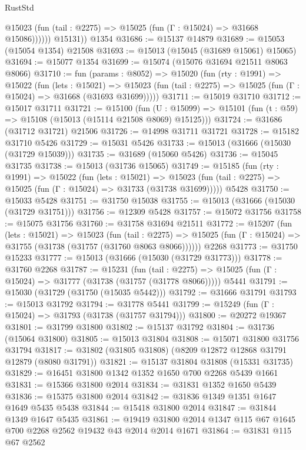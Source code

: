 \begin{lexlean}{RustStd}
\begin{coremodule}
              @15023 (fun (tail : @2275) => @15025 (fun (Γ : @15024) => @31668 @15086))))))
        @15131))
    @1354
@31686 := @15137 @14879
@31689 := @15053 (@15054 @1354) @21508
@31693 := @15013 (@15045 (@31689 @15061) @15065)
@31694 := @15077 @1354
@31699 := @15074 (@15076 @31694 @21511 @8063 @8066)
@31710 := fun (params : @8052) =>
  @15020
    (fun (rty : @1991) =>
    @15022
      (fun (lets : @15021) =>
      @15023 (fun (tail : @2275) => @15025 (fun (Γ : @15024) => @31668 (@31693 @31699)))))
@31711 := @15019 @31710
@31712 := @15017 @31711
@31721 := @15100
    (fun (U : @15099) => @15101 (fun (t : @59) => @15108 (@15013 (@15114 @21508 @8069) @15125)))
@31724 := @31686 (@31712 @31721) @21506
@31726 := @14998 @31711 @31721
@31728 := @15182 @31710 @5426
@31729 := @15031 @5426
@31733 := @15013 (@31666 (@15030 (@31729 @15039)))
@31735 := @31689 (@15060 @5426)
@31736 := @15045 @31735
@31738 := @15013 (@31736 @15065)
@31749 := @15185
    (fun (rty : @1991) =>
    @15022
      (fun (lets : @15021) =>
      @15023 (fun (tail : @2275) => @15025 (fun (Γ : @15024) => @31733 (@31738 @31699)))))
    @5428
@31750 := @15033 @5428
@31751 := @31750 @15038
@31755 := @15013 (@31666 (@15030 (@31729 @31751)))
@31756 := @12309 @5428
@31757 := @15072 @31756
@31758 := @15075 @31756
@31760 := @31758 @31694 @21511
@31772 := @15207
    (fun (lets : @15021) =>
    @15023
      (fun (tail : @2275) =>
      @15025 (fun (Γ : @15024) => @31755 (@31738 (@31757 (@31760 @8063 @8066))))))
    @2268
@31773 := @31750 @15233
@31777 := @15013 (@31666 (@15030 (@31729 @31773)))
@31778 := @31760 @2268
@31787 := @15231
    (fun (tail : @2275) => @15025 (fun (Γ : @15024) => @31777 (@31738 (@31757 (@31778 @8066)))))
    @5441
@31791 := @15030 (@31729 (@31750 (@15035 @5442)))
@31792 := @31666 @31791
@31793 := @15013 @31792
@31794 := @31778 @5441
@31799 := @15249 (fun (Γ : @15024) => @31793 (@31738 (@31757 @31794)))
@31800 := @20272 @19367
@31801 := @31799 @31800
@31802 := @15137 @31792
@31804 := @31736 (@15064 @31800)
@31805 := @15013 @31804
@31808 := @15071 @31800 @31756 @31794
@31817 := @31802 (@31805 @31808) (@8209 @12872 @12868 @31791 @12879 (@8080 @31791))
@31821 := @15137 @31804 @31808 (@15331 @31735)
@31829 := @16451 @31800 @1342 @1352 @1650 @700 @2268 @5439 @1661
@31831 := @15366 @31800 @2014
@31834 := @31831 @1352 @1650 @5439
@31836 := @15375 @31800 @2014
@31842 := @31836 @1349 @1351 @1647 @1649 @5435 @5438
@31844 := @15418 @31800 @2014
@31847 := @31844 @1349 @1647 @5435
@31861 := @19419 @31800 @2014 @1347 @115 @67 @1645 @700 @2268 @2562 @19432 @43 @2014 @2014 @1671
@31864 := @31831 @115 @67 @2562

\end{coremodule}
\end{lexlean}
